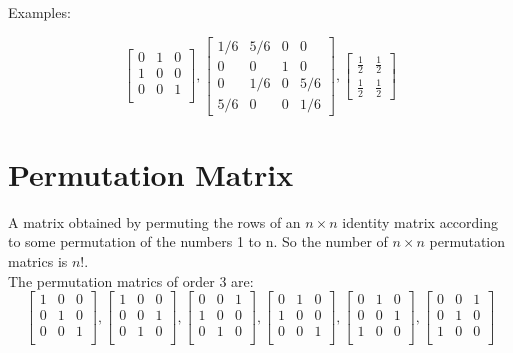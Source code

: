 Examples:

\[
  \begin{bmatrix}
    0 & 1 & 0 \\
    1 & 0 & 0 \\
    0 & 0 & 1 \\
  \end{bmatrix}
  ,
    \begin{bmatrix}
     1/6 & 5/6 & 0 & 0 \\
     0 & 0 & 1 & 0 \\
     0 & 1/6 & 0 & 5/6 \\
     5/6 & 0 & 0 & 1/6
    \end{bmatrix}
  ,
    \begin{bmatrix}
     \frac{1}{2} & \frac{1}{2} \\
     \frac{1}{2} & \frac{1}{2}
    \end{bmatrix}
\]

\section{Permutation Matrix}

A matrix obtained by permuting the rows of an $n\times n$ identity matrix according to some permutation of the numbers 1 to n. So the number of $n\times n$ permutation matrics is $n!$.\\

The permutation matrics of order 3 are:
\[
  \begin{bmatrix}
    1 & 0 & 0 \\
    0 & 1 & 0 \\
    0 & 0 & 1 \\
  \end{bmatrix}
  ,
    \begin{bmatrix}
     1 & 0 & 0 \\
     0 & 0 & 1 \\
     0 & 1 & 0 \\
    \end{bmatrix}
  ,
    \begin{bmatrix}
     0 & 0 & 1 \\
     1 & 0 & 0 \\
     0 & 1 & 0 \\
    \end{bmatrix}
    ,
    \begin{bmatrix}
     0 & 1 & 0 \\
     1 & 0 & 0 \\
     0 & 0 & 1 \\
    \end{bmatrix}
    ,
    \begin{bmatrix}
     0 & 1 & 0 \\
     0 & 0 & 1 \\
     1 & 0 & 0 \\
    \end{bmatrix}
    ,
    \begin{bmatrix}
     0 & 0 & 1 \\
     0 & 1 & 0 \\
     1 & 0 & 0 \\
    \end{bmatrix}
\]


